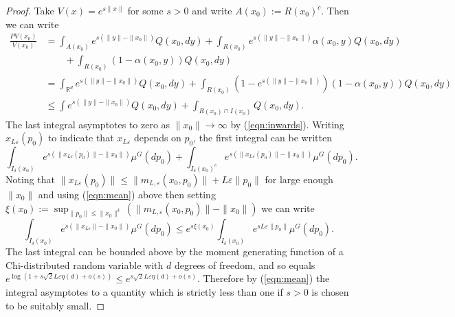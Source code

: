 \documentclass[bj,numbers,noshowframe]{imsart}
\newcommand{\e}{\varepsilon}
\theoremstyle{definition}
\theoremstyle{plain}
\theoremstyle{definition}
\begin{document}
\begin{proof}
Take $V(x) = e^{s\|x\|}$ for some $s > 0$ and write $A(x_0) := R(x_0)^c$. Then we can write
\begin{align*}
\frac{PV(x_0)}{V(x_0)} 
&= 
\int_{A(x_0)} e^{s(\|y\| - \|x_0\|)}Q(x_0,dy) + \int_{R(x_0)} e^{s(\|y\| - \|x_0\|)}\alpha(x_0,y)Q(x_0,dy) \\
&\qquad + \int_{R(x_0)} (1-\alpha(x_0,y))Q(x_0,dy) 
\\
&= 
\int_{\mathbb{R}^d} e^{s(\|y\| - \|x_0\|)}Q(x_0,dy) + \int_{R(x_0)} \left(1 - e^{s(\|y\| - \|x_0\|)} \right) (1-\alpha(x_0,y)) Q(x_0,dy) 
\\
&\leq
\int e^{s(\|y\| - \|x_0\|)}Q(x_0,dy) + \int_{R(x_0) \cap I(x_0)} Q(x_0,dy).
\end{align*}
The last integral asymptotes to zero as $\|x_0\| \to \infty$ by (\ref{eqn:inwards}).  Writing $x_{L\e}(p_0)$ to indicate that $x_{L\e}$ depends on $p_0$, the first integral can be written
\begin{equation} \label{eqn:brokenupintegral}
\int_{I_\delta(x_0)} e^{s(\|x_{L\e}(p_0)\| - \|x_0\|)} \mu^G(dp_0) + \int_{I_\delta(x_0)^c} e^{s(\|x_{L\e}(p_0)\| - \|x_0\|)} \mu^G(dp_0).
\end{equation}
Noting that $\|x_{L\e}(p_0)\| \leq \|m_{L,\e}(x_0,p_0)\| + L\e\|p_0\|$ for large enough $\|x_0\|$ and using (\ref{eqn:mean}) above then setting $\xi(x_0):=\sup_{\|p_0\|\leq \|x_0\|^\delta}(\|m_{L,\e}(x_0,p_0)\|-\|x_0\|)$ we can write
\[
\int_{I_\delta(x_0)} e^{s(\|x_{L\e}\| - \|x_0\|)} \mu^G(dp_0) \leq e^{s\xi(x_0)} \int_{I_\delta(x_0)} e^{sL\e\|p_0\|}\mu^G(dp_0).
\]
The last integral can be bounded above by the moment generating function of a Chi-distributed random variable with $d$ degrees of freedom, and so equals $e^{\log(1+s\sqrt{2}L\e \eta(d) +o(s))} \leq e^{s\sqrt{2}L\e \eta(d) +o(s)}$.  Therefore by (\ref{eqn:mean}) the integral asymptotes to a quantity which is strictly less than one if $s>0$ is chosen to be suitably small.


\end{proof}
\end{document}
